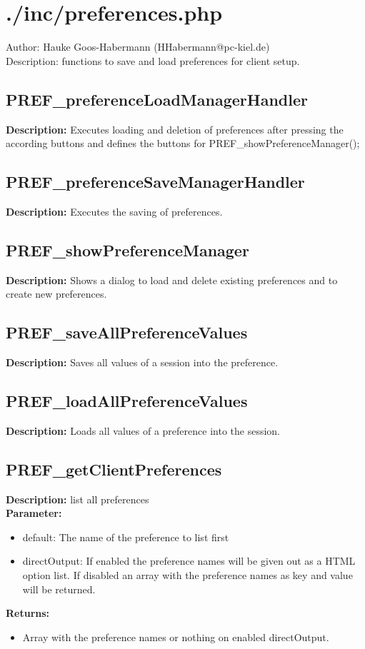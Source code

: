 \newpage\section{./inc/preferences.php}
 Author: Hauke Goos-Habermann (HHabermann@pc-kiel.de)\\
 Description: functions to save and load preferences for client setup.\\

\subsection{PREF\_preferenceLoadManagerHandler}
\textbf{Description:} Executes loading and deletion of preferences after pressing the according buttons and defines the buttons for PREF\_showPreferenceManager();\\

\subsection{PREF\_preferenceSaveManagerHandler}
\textbf{Description:} Executes the saving of preferences.\\

\subsection{PREF\_showPreferenceManager}
\textbf{Description:} Shows a dialog to load and delete existing preferences and to create new preferences.\\

\subsection{PREF\_saveAllPreferenceValues}
\textbf{Description:} Saves all values of a session into the preference.\\

\subsection{PREF\_loadAllPreferenceValues}
\textbf{Description:} Loads all values of a preference into the session.\\

\subsection{PREF\_getClientPreferences}
\textbf{Description:} list all preferences\\
\textbf{Parameter:}
\begin{itemize}
\item default: The name of the preference to list first
\item directOutput: If enabled the preference names will be given out as a HTML option list. If disabled an array with the preference names as key and value will be returned.
\end{itemize}
\textbf{Returns:}
\begin{itemize}
\item Array with the preference names or nothing on enabled directOutput.
\end{itemize}

